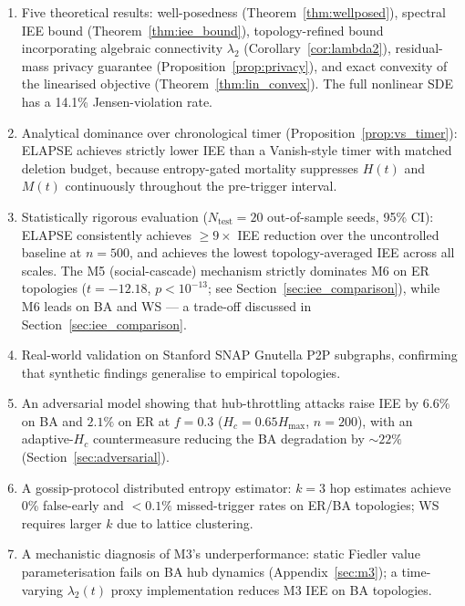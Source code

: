 \documentclass[review,12pt]{elsarticle}
\newcommand{\Hc}{H_c}
\newcommand{\Hmax}{H_{\max}}
\newcommand{\lambdat}{\lambda_2}
\begin{document}
\begin{enumerate}
  \item Five theoretical results: well-posedness (Theorem~\ref{thm:wellposed}),
        spectral IEE bound (Theorem~\ref{thm:iee_bound}), topology-refined
        bound incorporating algebraic connectivity $\lambda_2$
        (Corollary~\ref{cor:lambda2}), residual-mass privacy guarantee
        (Proposition~\ref{prop:privacy}), and exact convexity of the
        linearised objective (Theorem~\ref{thm:lin_convex}).
        The full nonlinear SDE has a 14.1\% Jensen-violation rate.
  \item Analytical dominance over chronological timer (Proposition~\ref{prop:vs_timer}):
        ELAPSE achieves strictly lower IEE than a Vanish-style timer with
        matched deletion budget, because entropy-gated mortality suppresses
        $H(t)$ and $M(t)$ continuously throughout the pre-trigger interval.
  \item Statistically rigorous evaluation ($N_{\mathrm{test}}=20$ out-of-sample
        seeds, 95\% CI): ELAPSE consistently achieves $\geq 9\times$ IEE
        reduction over the uncontrolled baseline at $n=500$, and achieves the
        lowest topology-averaged IEE across all scales.  The M5 (social-cascade)
        mechanism strictly dominates M6 on ER topologies
        ($t=-12.18$, $p<10^{-13}$; see Section~\ref{sec:iee_comparison}),
        while M6 leads on BA and WS — a trade-off discussed in
        Section~\ref{sec:iee_comparison}.
  \item Real-world validation on Stanford SNAP Gnutella P2P subgraphs,
        confirming that synthetic findings generalise to empirical topologies.
  \item An adversarial model showing that hub-throttling attacks raise IEE
        by $6.6\%$ on BA and $2.1\%$ on ER at $f=0.3$ ($\Hc=0.65\Hmax$,
        $n=200$), with an adaptive-$\Hc$ countermeasure reducing the BA
        degradation by $\sim 22\%$ (Section~\ref{sec:adversarial}).
  \item A gossip-protocol distributed entropy estimator: $k=3$ hop estimates
        achieve 0\% false-early and $<0.1\%$ missed-trigger rates on ER/BA
        topologies; WS requires larger $k$ due to lattice clustering.
  \item A mechanistic diagnosis of M3's underperformance: static Fiedler
        value parameterisation fails on BA hub dynamics (Appendix~\ref{sec:m3});
        a time-varying $\lambdat(t)$ proxy implementation reduces M3 IEE
        on BA topologies.
\end{enumerate}
\end{document}

